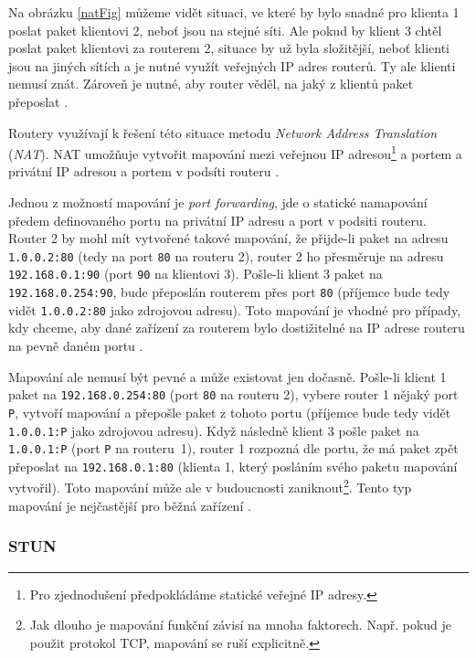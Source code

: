 Na obrázku \ref{natFig} můžeme vidět situaci, ve které by bylo snadné pro
klienta 1 poslat paket klientovi 2, neboť jsou na stejné síti. Ale pokud by
klient 3 chtěl poslat paket klientovi za routerem 2, situace by už byla
složitější, neboť klienti jsou na jiných sítích a je nutné využít veřejných IP
adres routerů. Ty ale klienti nemusí znát. Zároveň je nutné, aby router
věděl, na jaký z klientů paket přeposlat \cite{WebRTCForTheCurious}.

Routery využívají k řešení této situace metodu \textit{Network Address
    Translation} (\textit{NAT}). NAT umožňuje vytvořit mapování mezi veřejnou IP
adresou\footnote{Pro zjednodušení předpokládáme statické veřejné IP adresy.} a
portem a privátní IP adresou a portem v podsíti routeru
\cite{WebRTCForTheCurious}.

Jednou z možností mapování je \textit{port forwarding}, jde o statické
namapování předem definovaného portu na privátní IP adresu a port v podsiti
routeru. Router 2 by mohl mít vytvořené takové mapování, že přijde-li paket na
adresu \texttt{1.0.0.2:80} (tedy na port \texttt{80} na
routeru 2), router 2 ho přesměruje na adresu \texttt{192.168.0.1:90}
(port \texttt{90} na klientovi 3). Pošle-li klient 3 paket na
\texttt{192.168.0.254:90}, bude přeposlán routerem přes port
\texttt{80} (příjemce bude tedy vidět \texttt{1.0.0.2:80}
jako zdrojovou adresu). Toto mapování je vhodné pro případy, kdy chceme, aby
dané zařízení za routerem bylo dostižitelné na IP adrese routeru na pevně daném
portu \cite{G2-WhatIsPortForwarding}.

Mapování ale nemusí být pevné a může existovat jen dočasně. Pošle-li klient 1
paket na \texttt{192.168.0.254:80} (port \texttt{80} na
routeru 2), vybere router 1 nějaký port \texttt{P}, vytvoří mapování a
přepošle paket z tohoto portu (příjemce bude tedy vidět
\texttt{1.0.0.1:P} jako zdrojovou adresu). Když následně klient 3
pošle paket na \texttt{1.0.0.1:P} (port \texttt{P} na
routeru~1), router 1 rozpozná dle portu, že má paket zpět přeposlat na
\texttt{192.168.0.1:80} (klienta 1, který posláním svého paketu
mapování vytvořil). Toto mapování může ale v budoucnosti zaniknout\footnote{Jak
    dlouho je mapování funkční závisí na mnoha faktorech. Např. pokud je použit
    protokol TCP, mapování se ruší explicitně.}. Tento typ mapování je nejčastější
pro běžná zařízení \cite{WebRTCForTheCurious}.

\subsubsection{STUN}

